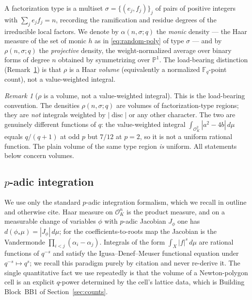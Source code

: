 \documentclass[pdflatex,sn-mathphys-num]{sn-jnl}%
\DeclareMathOperator{\disc}{disc}
\newcommand{\OK}{\mathcal{O}_K}
\newcommand{\bbF}{\mathbb{F}}
\newcommand{\bbP}{\mathbb{P}}
\theoremstyle{plain}
\theoremstyle{definition}
\theoremstyle{remark}
\newtheorem{remark}[theorem]{Remark}
\numberwithin{equation}{section}
\begin{document}
A factorization type is a multiset $\sigma=\{(e_{j},f_{j})\}_{j}$ of pairs of
positive integers with $\sum_{j}e_{j}f_{j}=n$, recording the ramification and
residue degrees of the irreducible local factors. We denote by
$\alpha(n,\sigma;q)$ the \emph{monic} density --- the Haar measure of the set of
monic $h$ as in \eqref{eq:random-poly} of type $\sigma$ --- and by
$\rho(n,\sigma;q)$ the \emph{projective} density, the weight-normalized average
over binary forms of degree $n$ obtained by symmetrizing over $\bbP^{1}$. The
load-bearing distinction (Remark~\ref{rem:volume-not-value}) is that $\rho$ is a
Haar \emph{volume} (equivalently a normalized $\bbF_{q}$-point count), not a
value-weighted integral.

\begin{remark}[$\rho$ is a volume, not a value-weighted integral]\label{rem:volume-not-value}
This is the load-bearing convention. The densities $\rho(n,\sigma;q)$ are volumes
of factorization-type regions; they are \emph{not} integrals weighted by
$|\disc|$ or any other character. The two are genuinely different functions of
$q$: the value-weighted integral $\int_{\OK^{2}}|a^{2}-4b|\,d\mu$ equals
$q/(q+1)$ at odd $p$ but $7/12$ at $p=2$, so it is not a uniform rational
function. The plain volume of the same type region \emph{is} uniform. All
statements below concern volumes.
\end{remark}

\subsection{$p$-adic integration}\label{sec:padic-integration}

We use only the standard $p$-adic integration formalism, which we recall in
outline and otherwise cite. Haar measure on $\OK^{n}$ is the product measure, and
on a measurable change of variables $\phi$ with $p$-adic Jacobian $J_{\phi}$ one
has $d(\phi_{*}\mu)=|J_{\phi}|\,d\mu$; for the coefficients-to-roots map the
Jacobian is the Vandermonde $\prod_{i<j}(\alpha_{i}-\alpha_{j})$. Integrals of the
form $\int_{X}|f|^{s}\,d\mu$ are rational functions of $q^{-s}$ and satisfy the
Igusa--Denef--Meuser functional equation under $q^{-s}\mapsto q^{s}$; we recall
this paradigm purely by citation \cite{denef1991functional,igusa2000introduction}
and never re-derive it. The single quantitative fact we use repeatedly is that the
volume of a Newton-polygon cell is an explicit $q$-power determined by the cell's
lattice data, which is Building Block~\textsc{BB1} of Section~\ref{sec:counts}.
\end{document}
